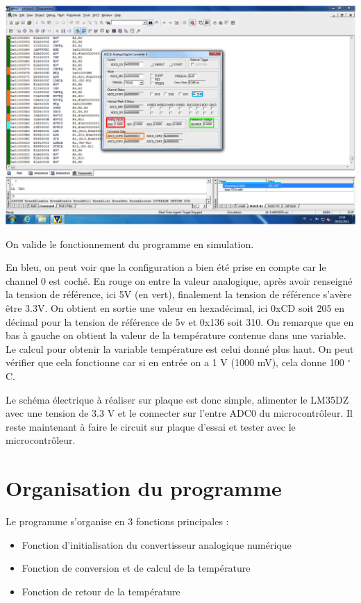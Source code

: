 \documentclass[a4paper]{report}
\begin{document}
\begin{center}
	\includegraphics[scale=0.6]{images/TEMP_capture.png}
\end{center}

On valide le fonctionnement du programme en simulation.

En bleu, on peut voir que la configuration a bien été prise en compte car le channel 0 est coché. En rouge on entre la valeur analogique, après avoir renseigné la tension de référence, ici 5V (en vert), finalement la tension de référence s'avère être 3.3V. On obtient en sortie une valeur en hexadécimal, ici 0xCD soit 205 en décimal pour la tension de référence de 5v et 0x136 soit 310. On remarque que en bas à gauche on obtient la valeur de la température contenue dans une variable. Le calcul pour obtenir la variable température est celui donné plus haut. On peut vérifier que cela fonctionne car si en entrée on a 1 V (1000 mV), cela donne 100 $^\circ$C.

Le schéma électrique à réaliser sur plaque est donc simple, alimenter le LM35DZ avec une tension de 3.3 V et le connecter sur l'entre ADC0 du microcontrôleur.
Il reste maintenant à faire le circuit sur plaque d'essai et tester avec le microcontrôleur.

\section{Organisation du programme}
Le programme s'organise en 3 fonctions principales :
\begin{itemize}
\item Fonction d'initialisation du convertisseur analogique numérique
\item Fonction de conversion et de calcul de la température
\item Fonction de retour de la température
\end{itemize}
\end{document}
